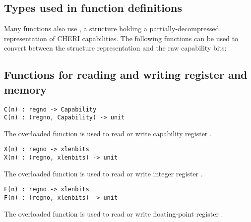 \label{sailRISCVzzones}

\subsection*{Types used in function definitions}


\medskip
\noindent
Many functions also use , a structure holding a
partially-decompressed representation of CHERI capabilities.
%
The following functions can be used to convert between the structure
representation and the raw capability bits:

\medskip%

\subsection*{Functions for reading and writing register and memory}

\begin{lstlisting}[language=sail,label=sailRISCVzC]
C(n) : regno -> Capability
C(n) : (regno, Capability) -> unit
\end{lstlisting}
The overloaded function  is used to read or write capability register .

\begin{lstlisting}[language=sail,label=sailRISCVzX]
X(n) : regno -> xlenbits
X(n) : (regno, xlenbits) -> unit
\end{lstlisting}
The overloaded function  is used to read or write integer register .

\begin{lstlisting}[language=sail,label=sailRISCVzF]
F(n) : regno -> xlenbits
F(n) : (regno, xlenbits) -> unit
\end{lstlisting}
The overloaded function  is used to read or write floating-point register .

\medskip
{}

\medskip
{}



